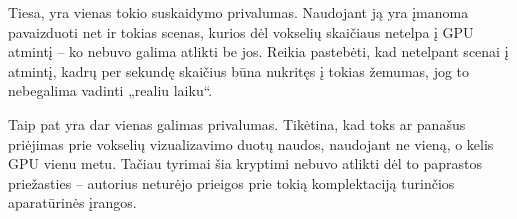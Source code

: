 Tiesa, yra vienas tokio suskaidymo privalumas. Naudojant ją yra įmanoma
pavaizduoti net ir tokias scenas, kurios dėl vokselių skaičiaus netelpa į GPU
atmintį -- ko nebuvo galima atlikti be jos. Reikia pastebėti, kad netelpant
scenai į atmintį, kadrų per sekundę skaičius būna nukritęs į tokias žemumas,
jog to nebegalima vadinti „realiu laiku“.

Taip pat yra dar vienas galimas privalumas. Tikėtina, kad toks ar panašus
priėjimas prie vokselių vizualizavimo duotų naudos, naudojant ne vieną, o
kelis GPU vienu metu. Tačiau tyrimai šia kryptimi nebuvo atlikti dėl to
paprastos priežasties -- autorius neturėjo prieigos prie tokią komplektaciją
turinčios aparatūrinės įrangos.


